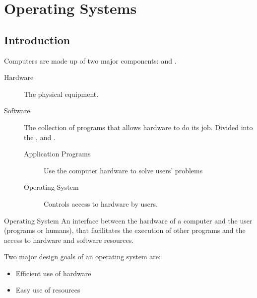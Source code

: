 \documentclass[\main/notes.tex]{subfiles}
\begin{document}
	\ifSubfilesClassLoaded{\setcounter{chapter}{6}}{}
	\chapter{Operating Systems}
		\section{Introduction}
			Computers are made up of two major components:  and .
			\begin{indentparagraph}
				\begin{description}
					\item[Hardware] The physical equipment.
					\item[Software] The collection of programs that allows hardware to do its job. Divided into the , and .
					\begin{indentparagraph}
						\begin{description}
							\item[Application Programs] Use the computer hardware to solve users' problems
							\item[Operating System] Controls access to hardware by users.
						\end{description}
					\end{indentparagraph}
				\end{description}
			\end{indentparagraph}
			\begin{definition}{Operating System}
				An interface between the hardware of a computer and the user (programs or humans), that facilitates the execution of other programs and the access to hardware and software resources.
			\end{definition}
			Two major design goals of an operating system are:
			\begin{indentparagraph}
				\begin{itemize}
					\item Efficient use of hardware
					\item Easy use of resources
				\end{itemize}
			\end{indentparagraph}
\end{document}
